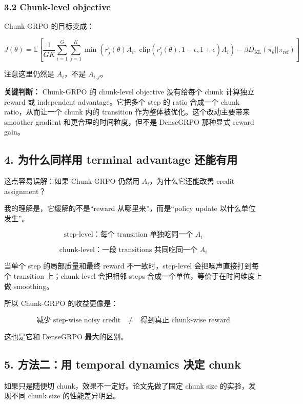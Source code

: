 \subsubsection{3.2 Chunk-level objective}

Chunk-GRPO 的目标变成：

\[
J(\theta)
=
\mathbb{E}
\left[
\frac{1}{GK}
\sum_{i=1}^{G}
\sum_{j=1}^{K}
\min
\left(
r_j^i(\theta)A_i,\;
\mathrm{clip}(r_j^i(\theta),1-\epsilon,1+\epsilon)A_i
\right)
-\beta D_{\mathrm{KL}}(\pi_\theta||\pi_{\mathrm{ref}})
\right]
\]

注意这里仍然是 \(A_i\)，不是 \(A_{i,j}\)。

\begin{warnbox}
\textbf{关键判断：} Chunk-GRPO 的 chunk-level objective 没有给每个 chunk 计算独立 reward 或 independent advantage。它把多个 step 的 ratio 合成一个 chunk ratio，从而让一个 chunk 内的 transition 作为整体被优化。这个改动主要带来 smoother gradient 和更合理的时间粒度，但不是 DenseGRPO 那种显式 reward gain。
\end{warnbox}

\subsection{4. 为什么同样用 terminal advantage 还能有用}

这点容易误解：如果 Chunk-GRPO 仍然用 \(A_i\)，为什么它还能改善 credit assignment？

我的理解是，它缓解的不是“reward 从哪里来”，而是“policy update 以什么单位发生”。

\[
\text{step-level：每个 transition 单独吃同一个 } A_i
\]

\[
\text{chunk-level：一段 transitions 共同吃同一个 } A_i
\]

当单个 step 的局部质量和最终 reward 不一致时，step-level 会把噪声直接打到每个 transition 上；chunk-level 会把相邻 steps 合成一个单位，等价于在时间维度上做 smoothing。

所以 Chunk-GRPO 的收益更像是：

\[
\text{减少 step-wise noisy credit}
\quad
\neq
\quad
\text{得到真正 chunk-wise reward}
\]

这也是它和 DenseGRPO 最大的区别。

\subsection{5. 方法二：用 temporal dynamics 决定 chunk}

如果只是随便切 chunk，效果不一定好。论文先做了固定 chunk size 的实验，发现不同 chunk size 的性能差异明显。

